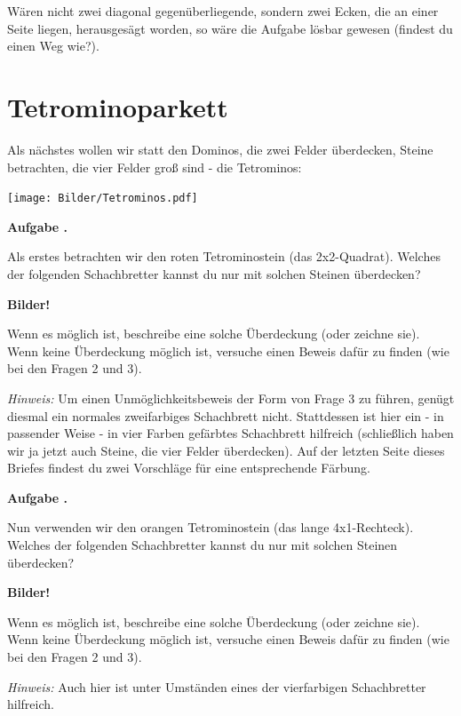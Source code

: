\documentclass[a4paper,ngerman,12pt]{scrartcl}
\theoremstyle{definition}
\theoremstyle{plain}
\theoremstyle{remark}
\newlength{\aufgabenskip}
\newcounter{aufgabennummer}
\newenvironment{aufgabe}[1]{
	\addtocounter{aufgabennummer}{1}
	\textbf{Aufgabe \theaufgabennummer.} \emph{#1} \par
}{\vspace{\aufgabenskip}}
\begin{document}
Wären nicht zwei diagonal gegenüberliegende, sondern zwei Ecken, die an einer Seite liegen, herausgesägt worden, so wäre die Aufgabe lösbar gewesen (findest du einen Weg wie?).

\section{Tetrominoparkett}

Als nächstes wollen wir statt den Dominos, die zwei Felder überdecken, Steine betrachten, die vier Felder groß sind - die Tetrominos:

\begin{center}
	\texttt{[image: Bilder/Tetrominos.pdf]}
\end{center}

\begin{aufgabe}{}
	Als erstes betrachten wir den roten Tetrominostein (das 2x2-Quadrat). Welches der folgenden Schachbretter kannst du nur mit solchen Steinen überdecken? 
	
	\textbf{Bilder!}
	
	Wenn es möglich ist, beschreibe eine solche Überdeckung (oder zeichne sie). Wenn keine Überdeckung möglich ist, versuche einen Beweis dafür zu finden (wie bei den Fragen 2 und 3).
	
	\emph{Hinweis:} Um einen Unmöglichkeitsbeweis der Form von Frage 3 zu führen, genügt diesmal ein normales zweifarbiges Schachbrett nicht. Stattdessen ist hier ein - in passender Weise - in vier Farben gefärbtes \glqq Schachbrett\grqq{} hilfreich (schließlich haben wir ja jetzt auch Steine, die vier Felder überdecken). Auf der letzten Seite dieses Briefes findest du zwei Vorschläge für eine entsprechende Färbung.
\end{aufgabe}

\begin{aufgabe}{}
	Nun verwenden wir den orangen Tetrominostein (das lange 4x1-Rechteck). Welches der folgenden Schachbretter kannst du nur mit solchen Steinen überdecken? 
	
	\textbf{Bilder!}
	
	Wenn es möglich ist, beschreibe eine solche Überdeckung (oder zeichne sie). Wenn keine Überdeckung möglich ist, versuche einen Beweis dafür zu finden (wie bei den Fragen 2 und 3).
	
	\emph{Hinweis:} Auch hier ist unter Umständen eines der vierfarbigen \glqq Schachbretter\grqq{} hilfreich.
\end{aufgabe}
\end{document}
